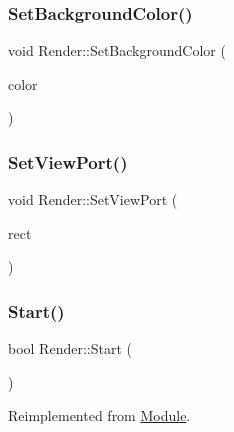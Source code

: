 \mbox{\label{class_render_a48588eec021d31ed31e9f474aa74b1df}} 
\subsubsection{\texorpdfstring{SetBackgroundColor()}{SetBackgroundColor()}}
{\footnotesize\ttfamily void Render\+::\+Set\+Background\+Color (\begin{DoxyParamCaption}\item[{S\+D\+L\+\_\+\+Color}]{color }\end{DoxyParamCaption})}

\mbox{\label{class_render_a228efb937133be5bbc677bfc98ddb406}} 
\subsubsection{\texorpdfstring{SetViewPort()}{SetViewPort()}}
{\footnotesize\ttfamily void Render\+::\+Set\+View\+Port (\begin{DoxyParamCaption}\item[{const S\+D\+L\+\_\+\+Rect \&}]{rect }\end{DoxyParamCaption})}

\mbox{\label{class_render_afe6d22551e6d5bbcc55cdd20ab23afde}} 
\subsubsection{\texorpdfstring{Start()}{Start()}}
{\footnotesize\ttfamily bool Render\+::\+Start (\begin{DoxyParamCaption}{ }\end{DoxyParamCaption})\hspace{0.3cm}{\ttfamily [virtual]}}



Reimplemented from \mbox{\hyperlink{class_module_aaf67046743296e8de310039a1dc95d86}{Module}}.

\mbox{\label{class_render_a7172f5776000ed7c973a26e35536f2d6}} 
